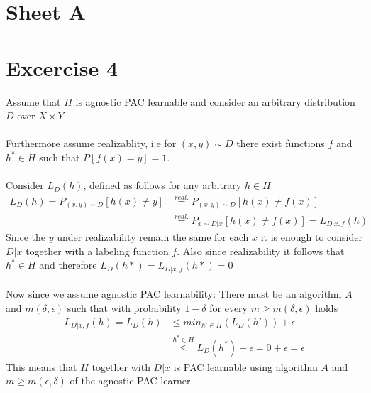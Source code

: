 \documentclass[12pt]{article}
\begin{document}
\section*{Sheet A}
\section*{Excercise 4}
Assume that $H$ is agnostic PAC learnable and consider an arbitrary distribution $D$ over $X \times Y$. \\\\
Furthermore assume realizablity, i.e for $(x,y) \sim D$ there exist functions $f$ and $h^* \in H$ such that $P[f(x) = y] = 1 $. \\\\
Consider $L_D(h)$, defined as follows for any arbitrary $h \in H$
\begin{align*}
	L_D(h) = P_{(x,y) \sim D}[h(x) \neq y] &\overset{real.}{=}  P_{(x,y) \sim D}[h(x) \neq f(x)] \\
	&\overset{real.}{=}  P_{x \sim D|x}[h(x) \neq f(x)]  = L_{D|x,f}(h)
\end{align*}
Since the $y$ under realizability remain the same for each $x$ it is enough to consider $D|x$ together with a labeling function $f$. Also since realizability it follows that $h^* \in H$ and therefore $L_D(h*) = L_{D|x,f}(h*) = 0$\\\\
Now since we assume agnostic PAC learnability: There must be an algorithm $A$ and $m(\delta,\epsilon)$ such that with probability $1-\delta$ for every $m \geq m(\delta,\epsilon)$ holds 
\begin{align*}
	L_{D|x,f}(h)= L_D(h) &\leq min_{h' \in H}(L_D(h')) + \epsilon \\
	&\overset{h^* \in H}{\leq}  L_D(h^*) + \epsilon = 0 + \epsilon =  \epsilon
\end{align*}
This means that $H$ together with $D|x$ is PAC learnable using algorithm $A$ and $m\geq m(\epsilon,\delta)$ of the agnostic PAC learner.
\end{document}
